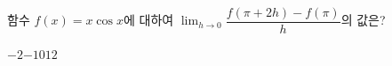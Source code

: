 함수 $f(x)=x\cos x$에 대하여 $\displaystyle\lim_{h\to 0}\dfrac{f(\pi+2h)-f(\pi)}{h}$의 값은?
\begin{choices32}{$-2$}{$-1$}{$0$}{$1$}{$2$}\end{choices32}
